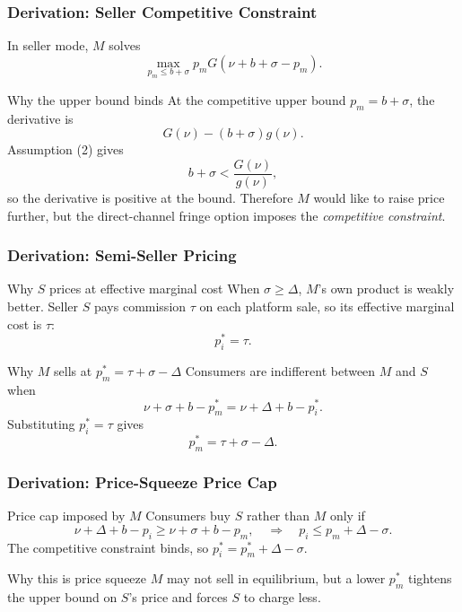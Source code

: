 \begin{frame}
  \frametitle{Derivation: Seller Competitive Constraint}
  \hypertarget{seller_competitive_deriv}{}
  \footnotesize

  In seller mode, $M$ solves
  \[
    \max_{p_m\leq b+\sigma}p_mG(\nu+b+\sigma-p_m).
  \]

  \begin{block}{Why the upper bound binds}
    At the competitive upper bound $p_m=b+\sigma$, the derivative is
    \[
      G(\nu)-(b+\sigma)g(\nu).
    \]
    Assumption (2) gives
    \[
      b+\sigma<\frac{G(\nu)}{g(\nu)},
    \]
    so the derivative is positive at the bound. Therefore $M$ would like
    to raise price further, but the direct-channel fringe option imposes
    the \textit{competitive constraint}.
  \end{block}

  \hyperlink{seller_competitive_src}{}
\end{frame}

\begin{frame}
  \frametitle{Derivation: Semi-Seller Pricing}
  \hypertarget{dual_semiseller_deriv}{}
  \footnotesize

  \begin{block}{Why $S$ prices at effective marginal cost}
    When $\sigma\geq\Delta$, $M$'s own product is weakly better. Seller $S$
    pays commission $\tau$ on each platform sale, so its effective marginal
    cost is $\tau$:
    \[
      p_i^*=\tau.
    \]
  \end{block}

  \begin{block}{Why $M$ sells at $p_m^*=\tau+\sigma-\Delta$}
    Consumers are indifferent between $M$ and $S$ when
    \[
      \nu+\sigma+b-p_m^*
      =
      \nu+\Delta+b-p_i^*.
    \]
    Substituting $p_i^*=\tau$ gives
    \[
      p_m^*=\tau+\sigma-\Delta.
    \]
  \end{block}

  \hyperlink{dual_semiseller_src}{}
\end{frame}

\begin{frame}
  \frametitle{Derivation: Price-Squeeze Price Cap}
  \hypertarget{dual_squeeze_deriv}{}
  \footnotesize

  \begin{block}{Price cap imposed by $M$}
    Consumers buy $S$ rather than $M$ only if
    \[
      \nu+\Delta+b-p_i
      \geq
      \nu+\sigma+b-p_m,
      \quad\Longrightarrow\quad
      p_i\leq p_m+\Delta-\sigma.
    \]
    The competitive constraint binds, so $p_i^*=p_m^*+\Delta-\sigma$.
  \end{block}

  \begin{alertblock}{Why this is price squeeze}
    $M$ may not sell in equilibrium, but a lower $p_m^*$ tightens the upper
    bound on $S$'s price and forces $S$ to charge less.
  \end{alertblock}

  \hyperlink{dual_squeeze_src}{}
\end{frame}

